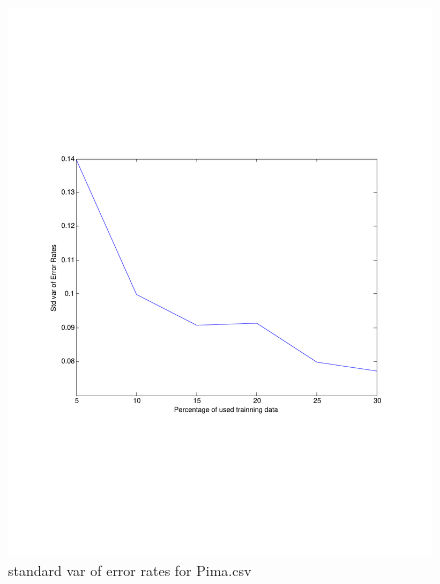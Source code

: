 \documentclass[12pt]{amsart}
\begin{document}
\begin{figure}[H]
\centering
        \includegraphics[totalheight=18cm]{Pima_std_nbg.pdf}
    \caption{standard var of error rates for Pima.csv}
    \label{fig:verticalcell21}
\end{figure}
\end{document}
